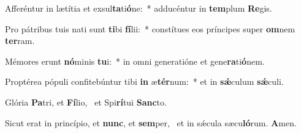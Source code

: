 \item Afferéntur in lætítia et exsul\textbf{ta}ti\textbf{ó}ne:~* adducéntur in \textbf{tem}plum \textbf{Re}gis.
\item Pro pátribus tuis nati sunt \textbf{ti}bi \textbf{fí}lii:~* constítues eos príncipes super \textbf{om}nem \textbf{ter}ram.
\item Mémores erunt \textbf{nó}minis \textbf{tu}i:~* in omni generatióne et gene\textbf{ra}ti\textbf{ó}nem.
\item Proptérea pópuli confitebúntur tibi \textbf{in} æ\textbf{tér}num:~* et in \textbf{sǽ}culum \textbf{sǽ}culi.
\item Glória \textbf{Pa}tri, et \textbf{Fí}lio,~\psstar{} et Spi\textbf{rí}tui \textbf{Sanc}to.
\item Sicut erat in princípio, et \textbf{nunc}, et \textbf{sem}per,~\psstar{} et in sǽcula sæcu\textbf{ló}rum. \textbf{A}men.
